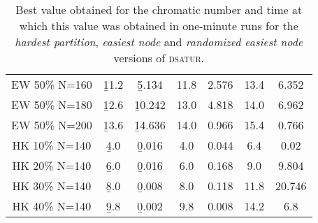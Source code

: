 \begin{table}
\begin{tabular}{|c|cc|cc|cc|}
EW 50\% N=160 & \b{11.2} & \b{5.134} & 11.8 & 2.576 & 13.4 & 6.352
\\
EW 50\% N=180 & \b{12.6} & \b{10.242} & 13.0 & 4.818 & 14.0 & 6.962
\\
EW 50\% N=200 & \b{13.6} & \b{14.636} & 14.0 & 0.966 & 15.4 & 0.766
\\
\hline
HK 10\% N=140 &  \b{4.0} & \b{0.016} &  4.0 & 0.044 &  6.4 & 0.02
\\
HK 20\% N=140 &  \b{6.0} & \b{0.016} &  6.0 & 0.168 &  9.0 & 9.804
\\
HK 30\% N=140 &  \b{8.0} & \b{0.008} &  8.0 & 0.118 & 11.8 & 20.746
\\
HK 40\% N=140 &  \b{9.8} & \b{0.002} &  9.8 & 0.008 & 14.2 &  6.8
\\
\hline 
 \end{tabular}

\caption{Best value obtained for the chromatic number and time at which this value was obtained in one-minute runs for the \textit{hardest partition}, \textit{easiest node} and \textit{randomized easiest node} versions of \textsc{dsatur}.}

\end{table}